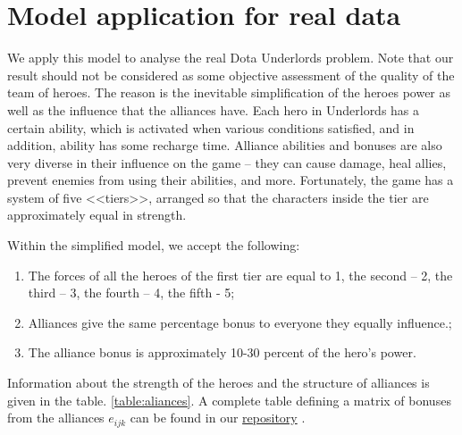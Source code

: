 \documentclass{article}
\begin{document}
\section{Model application for real data}
\label{SectionComputationalResults}
  
We apply this model to analyse the real Dota Underlords problem. Note that our result should not be considered as some objective assessment of the quality of the team of heroes. The reason is the inevitable simplification of the heroes power as well as the influence that the alliances have. Each hero in Underlords has a certain ability, which is activated when  various conditions satisfied, and in addition, ability has some recharge time. Alliance abilities and bonuses are also very diverse in their influence on the game -- they can cause damage, heal allies, prevent enemies from using their abilities, and more. Fortunately, the game has a system of five <<tiers>>, arranged so that the characters inside the tier are approximately equal in strength.

Within the simplified model, we accept the following:
\begin{enumerate}
\item The forces of all the heroes of the first tier are equal to 1,  the second -- 2, the third -- 3, the fourth -- 4, the fifth - 5;
\item Alliances give the same percentage bonus to everyone they equally influence.;
\item The alliance bonus is approximately 10-30 percent of the hero’s power.
\end{enumerate}

Information about the strength of the heroes and the structure of alliances is given in the table. \ref{table:aliances}. 
A complete table defining a matrix of bonuses from the alliances $e_{ijk} $ can be found in our \href{https://github.com/aponom84/UnderLords/blob/master/UnderLordsData.xlsx}{repository} \cite{UnderLordsInput}.
\end{document}
